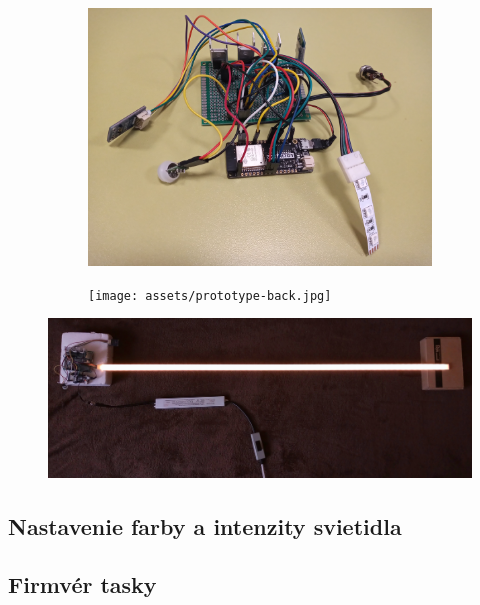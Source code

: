\documentclass[12pt, a4paper]{article}
\begin{document}
\begin{figure}[h]
\centering
\begin{subfigure}[b]{0.48\textwidth}
	\centering
	\includegraphics[width=\textwidth]{assets/prototype.jpg}
\end{subfigure}
\hfill
\begin{subfigure}[b]{0.48\textwidth}
	\centering
	\texttt{[image: assets/prototype-back.jpg]}
\end{subfigure}
\end{figure}

\begin{figure}
\includegraphics[width=\textwidth]{assets/lamp.jpg}
\end{figure}

\subsection{Nastavenie farby a intenzity svietidla}

\subsection{Firmvér tasky}
\end{document}
